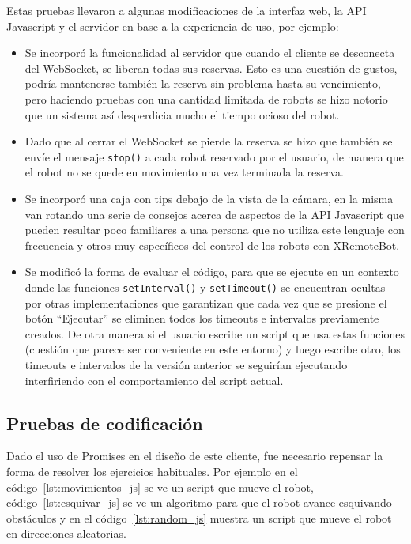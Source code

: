 Estas pruebas llevaron a algunas modificaciones de la interfaz
web, la API Javascript y el servidor en base a la experiencia de uso,
por ejemplo:
\begin{itemize}
    \item Se incorporó la funcionalidad al servidor que cuando
        el cliente se desconecta del WebSocket, se liberan todas
        sus reservas. Esto es una cuestión de gustos, podría
        mantenerse también la reserva sin problema hasta su
        vencimiento, pero haciendo pruebas con una cantidad
        limitada de robots se hizo notorio que un sistema
        así desperdicia mucho el tiempo ocioso del robot.
    \item Dado que al cerrar el WebSocket se pierde la reserva
        se hizo que también se envíe el mensaje \texttt{stop()}
        a cada robot reservado por el usuario, de manera
        que el robot no se quede en movimiento una vez
        terminada la reserva.
    \item Se incorporó una caja con tips debajo de la vista de
        la cámara, en la misma van rotando una serie de consejos
        acerca de aspectos de la API Javascript que pueden
        resultar poco familiares a una persona que no utiliza este
        lenguaje con frecuencia y otros muy específicos
        del control de los robots con XRemoteBot.
    \item Se modificó la forma de evaluar el código, para que se
        ejecute en un contexto donde las funciones
        \texttt{setInterval()} y \texttt{setTimeout()} se encuentran
        ocultas por otras implementaciones que garantizan que cada
        vez que se presione el botón ``Ejecutar'' se eliminen
        todos los timeouts e intervalos previamente creados.
        De otra manera si el usuario escribe un script que usa
        estas funciones
        (cuestión que parece ser conveniente en este entorno)
        y luego escribe otro, los timeouts e intervalos
        de la versión anterior se seguirían ejecutando
        interfiriendo con el comportamiento del script actual.
\end{itemize}

\subsection{Pruebas de codificación}

Dado el uso de Promises en el diseño de este cliente, fue
necesario repensar la forma
de resolver los ejercicios habituales. Por ejemplo en el
código~\ref{lst:movimientos_js} se ve un script que mueve el
robot,
código~\ref{lst:esquivar_js} se ve un algoritmo para que el robot
avance esquivando obstáculos y en el código~\ref{lst:random_js}
muestra un script que mueve el robot en direcciones aleatorias.

